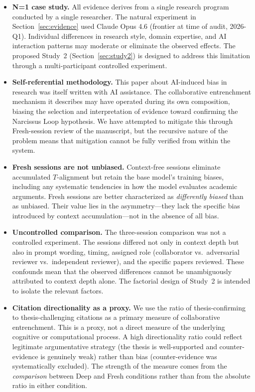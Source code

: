 \documentclass[12pt]{article}
\begin{document}
\begin{itemize}
    \item \textbf{N=1 case study.} All evidence derives from a single research program conducted by a single researcher. The natural experiment in Section~\ref{sec:evidence} used Claude Opus 4.6 (frontier at time of audit, 2026-Q1). Individual differences in research style, domain expertise, and AI interaction patterns may moderate or eliminate the observed effects. The proposed Study~2 (Section~\ref{sec:study2}) is designed to address this limitation through a multi-participant controlled experiment.

    \item \textbf{Self-referential methodology.} This paper about AI-induced bias in research was itself written with AI assistance. The collaborative entrenchment mechanism it describes may have operated during its own composition, biasing the selection and interpretation of evidence toward confirming the Narcissus Loop hypothesis. We have attempted to mitigate this through Fresh-session review of the manuscript, but the recursive nature of the problem means that mitigation cannot be fully verified from within the system.

    \item \textbf{Fresh sessions are not unbiased.} Context-free sessions eliminate accumulated $T$-alignment but retain the base model's training biases, including any systematic tendencies in how the model evaluates academic arguments. Fresh sessions are better characterized as \emph{differently biased} than as unbiased. Their value lies in the asymmetry---they lack the specific bias introduced by context accumulation---not in the absence of all bias.

    \item \textbf{Uncontrolled comparison.} The three-session comparison was not a controlled experiment. The sessions differed not only in context depth but also in prompt wording, timing, assigned role (collaborator vs.\ adversarial reviewer vs.\ independent reviewer), and the specific papers reviewed. These confounds mean that the observed differences cannot be unambiguously attributed to context depth alone. The factorial design of Study~2 is intended to isolate the relevant factors.

    \item \textbf{Citation directionality as a proxy.} We use the ratio of thesis-confirming to thesis-challenging citations as a primary measure of collaborative entrenchment. This is a proxy, not a direct measure of the underlying cognitive or computational process. A high directionality ratio could reflect legitimate argumentative strategy (the thesis is well-supported and counter-evidence is genuinely weak) rather than bias (counter-evidence was systematically excluded). The strength of the measure comes from the \emph{comparison} between Deep and Fresh conditions rather than from the absolute ratio in either condition.


\end{itemize}
\end{document}
